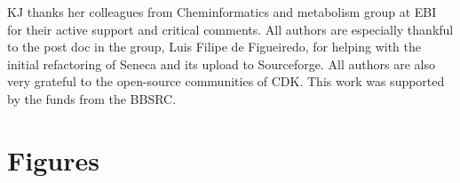 \documentclass[10pt]{bmc_article}
\newenvironment{bmcformat}{\begin{raggedright}\baselineskip20pt\sloppy\setboolean{publ}{false}}{\end{raggedright}\baselineskip20pt\sloppy}
\begin{document}
\begin{bmcformat}
KJ thanks her colleagues from Cheminformatics and metabolism group at EBI for their active support and critical comments. All authors are especially thankful to the post doc in the group, Luis Filipe de Figueiredo, for helping with the initial refactoring of Seneca and its upload to Sourceforge. All authors are also very grateful to the open-source communities of CDK. This work was supported by the funds from the BBSRC.   
  


{
   }     %





\section*{Figures}


\end{bmcformat}
\end{document}
